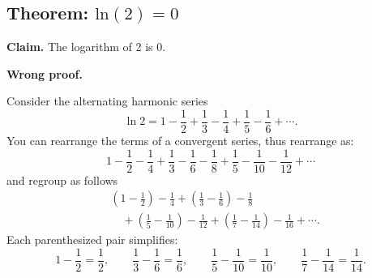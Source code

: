 \documentclass[11pt]{article}
\begin{document}















\subsection{Theorem: $\text{ln}(2) = 0$}

\textbf{Claim.} The logarithm of 2 is 0.

\textbf{Wrong proof.}

Consider the alternating harmonic series
\[
\ln2 = 1-\frac12+\frac13-\frac14+\frac15-\frac16+\cdots.
\]
You can rearrange the terms of a convergent series, thus rearrange as:
\[
1-\frac12-\frac14+\frac13-\frac16-\frac18+\frac15-\frac1{10}-\frac1{12}
+\cdots
\]
and regroup as follows
\[
\begin{aligned}
&\left(1-\frac12\right)-\frac14
+\left(\frac13-\frac16\right)-\frac18 \\
&\quad+\left(\frac15-\frac1{10}\right)-\frac1{12}
+\left(\frac17-\frac1{14}\right)-\frac1{16}
+\cdots.
\end{aligned}
\]
Each parenthesized pair simplifies:
\[
1-\frac12=\frac12,\qquad
\frac13-\frac16=\frac16,\qquad
\frac15-\frac1{10}=\frac1{10},\qquad
\frac17-\frac1{14}=\frac1{14}.
\]
\end{document}
